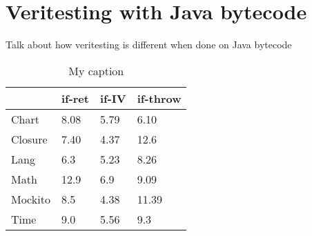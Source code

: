 \section{Veritesting with Java bytecode}
Talk about how veritesting is different when done on Java bytecode


\begin{table}[]
\centering
\caption{My caption}
\label{my-label}
\begin{tabular}{|l|l|l|l|}
\hline
        & if-ret & if-IV & if-throw \\ \hline
Chart   & 8.08   & 5.79  & 6.10     \\ \hline
Closure & 7.40   & 4.37  & 12.6     \\ \hline
Lang    & 6.3    & 5.23  & 8.26     \\ \hline
Math    & 12.9   & 6.9   & 9.09     \\ \hline
Mockito & 8.5    & 4.38  & 11.39    \\ \hline
Time    & 9.0    & 5.56  & 9.3      \\ \hline
\end{tabular}
\end{table}